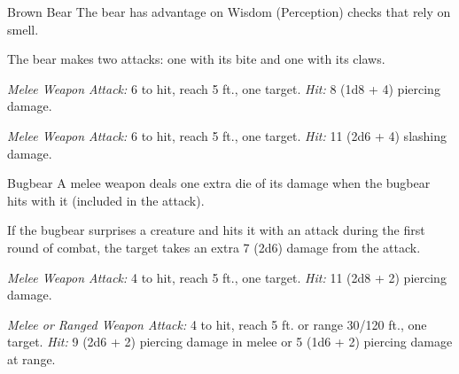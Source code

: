 \documentclass[10pt,a4paper,twoside,bg=print,twocolumn,openany,nodeprecatedcode]{dndbook}
\begin{document}
\begin{DndMonster}[float=t]{Brown Bear}
\DndMonsterBasics[
armor-class = {11 (natural armor)},
hit-points = {\DndDice{4d10 + 12}},
speed = {40 ft., climb 30 ft.}
]
\DndMonsterAbilityScores[
 str = 19,
 dex = 10,
 con = 16,
 int = 2,
 wis = 13,
 cha = 7
]
\DndMonsterDetails[
skills = {Perception +3},
challenge = 1,
]
The bear has advantage on Wisdom (Perception) checks that rely on smell.

The bear makes two attacks: one with its bite and one with its claws.

\textsl{Melee Weapon Attack:} 6 to hit, reach 5 ft., one target. \textsl{Hit:} 8 (1d8 + 4) piercing damage.

\textsl{Melee Weapon Attack:} 6 to hit, reach 5 ft., one target. \textsl{Hit:} 11 (2d6 + 4) slashing damage.

\end{DndMonster}



\begin{DndMonster}[float=t]{Bugbear}
\DndMonsterBasics[
armor-class = {16 (\textit{hide armor})},
hit-points = {\DndDice{5d8 + 5}},
speed = {30 ft.}
]
\DndMonsterAbilityScores[
 str = 15,
 dex = 14,
 con = 13,
 int = 8,
 wis = 11,
 cha = 9
]
\DndMonsterDetails[
skills = {Stealth +6, Survival +2},
senses = {darkvision 60 ft., passive perception 10},
languages = {Common, Goblin},
challenge = 1,
]
A melee weapon deals one extra die of its damage when the bugbear hits with it (included in the attack).

If the bugbear surprises a creature and hits it with an attack during the first round of combat, the target takes an extra 7 (2d6) damage from the attack.

\textsl{Melee Weapon Attack:} 4 to hit, reach 5 ft., one target. \textsl{Hit:} 11 (2d8 + 2) piercing damage.

\textsl{Melee or Ranged Weapon Attack:} 4 to hit, reach 5 ft. or range 30/120 ft., one target. \textsl{Hit:} 9 (2d6 + 2) piercing damage in melee or 5 (1d6 + 2) piercing damage at range.

\end{DndMonster}
\end{document}
